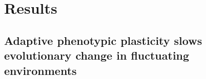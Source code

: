 
\section{Results}

\subsection{Adaptive phenotypic plasticity slows evolutionary change in fluctuating environments}





